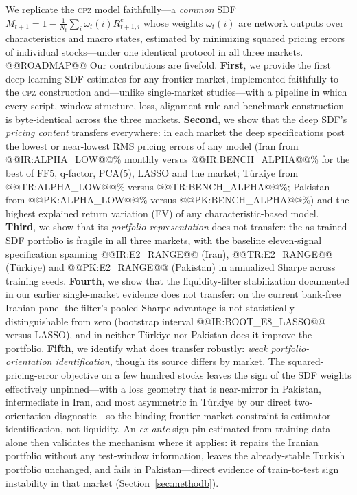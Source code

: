 \documentclass[12pt]{article}
\begin{document}
We replicate the \textsc{cpz} model faithfully---a \emph{common} SDF $M_{t+1}=1-\frac{1}{N_t}\sum_i \omega_t(i) R^e_{t+1,i}$ whose weights $\omega_t(i)$ are network outputs over characteristics and macro states, estimated by minimizing squared pricing errors of individual stocks---under one identical protocol in all three markets. @@ROADMAP@@ Our contributions are fivefold. \textbf{First}, we provide the first deep-learning SDF estimates for any frontier market, implemented faithfully to the \textsc{cpz} construction and---unlike single-market studies---with a pipeline in which every script, window structure, loss, alignment rule and benchmark construction is byte-identical across the three markets. \textbf{Second}, we show that the deep SDF's \emph{pricing content} transfers everywhere: in each market the deep specifications post the lowest or near-lowest RMS pricing errors of any model (Iran from @@IR:ALPHA_LOW@@\% monthly versus @@IR:BENCH_ALPHA@@\% for the best of FF5, q-factor, PCA(5), LASSO and the market; T\"urkiye from @@TR:ALPHA_LOW@@\% versus @@TR:BENCH_ALPHA@@\%; Pakistan from @@PK:ALPHA_LOW@@\% versus @@PK:BENCH_ALPHA@@\%) and the highest explained return variation (EV) of any characteristic-based model. \textbf{Third}, we show that its \emph{portfolio representation} does not transfer: the as-trained SDF portfolio is fragile in all three markets, with the baseline eleven-signal specification spanning @@IR:E2_RANGE@@ (Iran), @@TR:E2_RANGE@@ (T\"urkiye) and @@PK:E2_RANGE@@ (Pakistan) in annualized Sharpe across training seeds. \textbf{Fourth}, we show that the liquidity-filter stabilization documented in our earlier single-market evidence does not transfer: on the current bank-free Iranian panel the filter's pooled-Sharpe advantage is not statistically distinguishable from zero (bootstrap interval @@IR:BOOT_E8_LASSO@@ versus LASSO), and in neither T\"urkiye nor Pakistan does it improve the portfolio. \textbf{Fifth}, we identify what does transfer robustly: \emph{weak portfolio-orientation identification}, though its source differs by market. The squared-pricing-error objective on a few hundred stocks leaves the sign of the SDF weights effectively unpinned---with a loss geometry that is near-mirror in Pakistan, intermediate in Iran, and most asymmetric in T\"urkiye by our direct two-orientation diagnostic---so the binding frontier-market constraint is estimator identification, not liquidity. An \emph{ex-ante} sign pin estimated from training data alone then validates the mechanism where it applies: it repairs the Iranian portfolio without any test-window information, leaves the already-stable Turkish portfolio unchanged, and fails in Pakistan---direct evidence of train-to-test sign instability in that market (Section~\ref{sec:methodb}).
\end{document}
